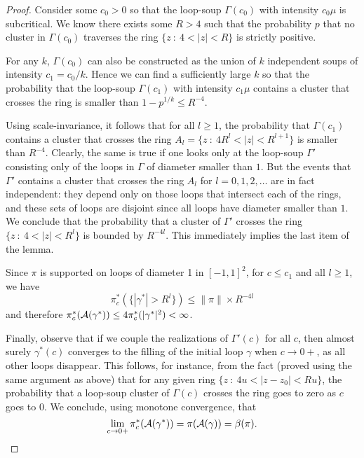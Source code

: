 \documentclass[11pt]{article}
\begin{document}
\begin {proof}
Consider some $c_0 > 0$ so that the loop-soup $\Gamma (c_0)$ 
with intensity $c_0 \mu$ is subcritical.  We know there exists some 
$R>4$ such that the probability $p$ that 
no cluster in $\Gamma (c_0)$ 
traverses the ring $\{ z \ : \ 4 < |z| < R \}$ 
is strictly positive. 

For any $k$, $\Gamma (c_0)$ can also be constructed as the union of
$k$ independent soups of intensity $c_1= c_0 / k$.
Hence we can find a sufficiently large $k$ so that
the probability that the loop-soup $\Gamma (c_1 )$ 
with intensity $c_1  \mu$ contains a cluster that crosses the ring 
is smaller than $1- p^{1/k} \le R^{-4}$.

Using scale-invariance, it follows that for all $l \ge 1$,
 the probability that $\Gamma (c_1)$ contains a cluster that crosses the ring 
$A_l= \{z \ : \ 4 R^l < |z| < R^{l+1} \}$ is smaller than $R^{-4}$. 
Clearly, the same is true if one looks only at the loop-soup $\Gamma'$ 
consisting only of the loops in $\Gamma$ of diameter smaller than $1$.
But the events that  $\Gamma'$ contains a cluster that crosses the ring $A_l$
for $l=0, 1, 2, \ldots$ are in fact independent: they depend only 
on those loops that intersect each of the rings, 
and these sets of loops are disjoint since all loops 
have diameter smaller than $1$. 
We conclude that the probability that a cluster of $\Gamma'$ crosses the ring 
$\{ z \  : \  4 < |z | < R^{l} \}$ is bounded by $R^{-4l}$. This immediately implies the last item of the lemma.

Since $\pi$ is supported on loops of diameter 1 in $[-1,1]^2$,
for $c \le c_1$ and all $l \ge 1$, we have 
$$ \pi_c^* ( \{ | \gamma^* | > R^l \} ) \le \| \pi \| \times R^{-4l}$$
and therefore $\pi_c^*( {\cal A} ( \gamma^* )) \le  4 \pi_c^* ( |\gamma^*|^2) < \infty$.

Finally, observe that if we couple the realizations of $\Gamma'(c)$ for all $c$, 
then almost surely
$\gamma^* (c)$ converges to the filling of the initial loop $\gamma$ when $c \to 0+$,
as all other loops disappear. 
This follows, for instance, from the fact (proved using the same argument as above)
that for any given ring
$\{ z \ : \  4u <  | z - z_0 | < Ru \}$, 
the probability that a loop-soup cluster of $\Gamma (c)$ 
crosses the ring goes to zero as $c$ goes to $0$. 
We conclude, using monotone convergence, that
$$ 
\lim_{c \to 0+} \pi_c^* ( {\cal A} ( \gamma^* ) ) = 
\pi ( {\cal A}(\gamma)) = \beta ( \pi).
$$
\end {proof}
\end{document}
